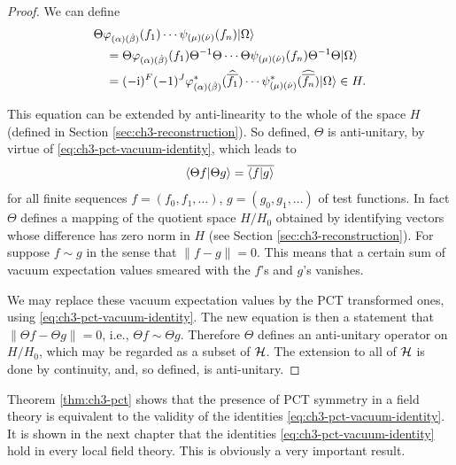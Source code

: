 \begin{proof}
We can define
\begin{equation*}
\begin{aligned}
&\Theta\varphi_{(\alpha)(\dot\beta)}(f_1)\cdots
\psi_{(\mu)(\dot\nu)}(f_n)\lvert \Omega\rangle \\
&\quad={ }\Theta\varphi_{(\alpha)(\dot\beta)}(f_1)\Theta^{-1}\Theta\cdots
\Theta\psi_{(\mu)(\dot\nu)}(f_n)\Theta^{-1}\Theta\lvert \Omega\rangle \\
&\quad={ }(-\mathrm{i})^F(-1)^J
\varphi^*_{(\alpha)(\dot\beta)}(\widehat{\overline{f_1}})\cdots
\psi^*_{(\mu)(\dot\nu)}(\widehat{\overline{f_n}})\lvert \Omega\rangle\in H.
\end{aligned}
\end{equation*}

This equation can be extended by anti-linearity to the whole of the space $H$
(defined in Section \ref{sec:ch3-reconstruction}).  So defined, $\Theta$ is anti-unitary, by virtue of
\eqref{eq:ch3-pct-vacuum-identity}, which leads to
\begin{equation*}
  \langle \Theta f\vert \Theta g\rangle=\overline{\langle f\vert g\rangle}
\end{equation*}
for all finite sequences $f=(f_0,f_1,\ldots)$, $g=(g_0,g_1,\ldots)$ of test
functions.  In fact $\Theta$ defines a mapping of the quotient space $H/H_0$
obtained by identifying vectors whose difference has zero norm in $H$ (see
Section \ref{sec:ch3-reconstruction}).  For suppose $f\sim g$ in the sense that
$\lVert f-g\rVert=0$.  This means that a certain sum of vacuum expectation
values smeared with the $f$'s and $g$'s vanishes.

We may replace these vacuum expectation values by the PCT transformed ones,
using \eqref{eq:ch3-pct-vacuum-identity}.  The new equation is then a statement that
$\lVert\Theta f-\Theta g\rVert=0$, i.e., $\Theta f\sim\Theta g$.
Therefore $\Theta$ defines an anti-unitary operator on $H/H_0$, which may be
regarded as a subset of $\mathcal{H}$.  The extension to all of $\mathcal{H}$ is done
by continuity, and, so defined, is anti-unitary.
\end{proof}

Theorem \ref{thm:ch3-pct} shows that the presence of PCT symmetry in a field theory is
equivalent to the validity of the identities \eqref{eq:ch3-pct-vacuum-identity}.  It is shown in the next
chapter that the identities \eqref{eq:ch3-pct-vacuum-identity} hold in every local field theory.  This is
obviously a very important result.
